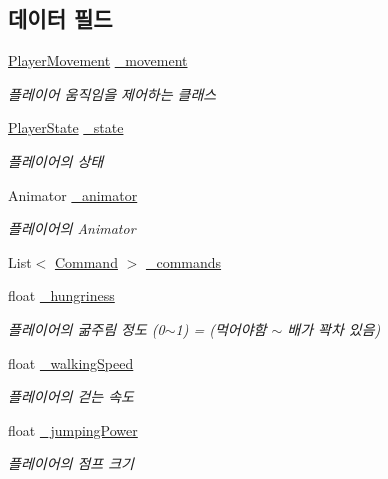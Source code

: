 \subsection*{데이터 필드}
\begin{DoxyCompactItemize}
\item 
\mbox{\hyperlink{class_player_movement}{Player\+Movement}} \mbox{\hyperlink{class_player_controller_ad788cfe2e37318d22d52010dc0fecd57}{\+\_\+movement}}
\begin{DoxyCompactList}\small\item\em 플레이어 움직임을 제어하는 클래스 \end{DoxyCompactList}\item 
\mbox{\hyperlink{class_player_state}{Player\+State}} \mbox{\hyperlink{class_player_controller_addcd33a9c23c1b949964365390c7a6eb}{\+\_\+state}}
\begin{DoxyCompactList}\small\item\em 플레이어의 상태 \end{DoxyCompactList}\item 
Animator \mbox{\hyperlink{class_player_controller_ada29d77d333483963257e51a6e15b8ae}{\+\_\+animator}}
\begin{DoxyCompactList}\small\item\em 플레이어의 Animator \end{DoxyCompactList}\item 
List$<$ \mbox{\hyperlink{class_command}{Command}} $>$ \mbox{\hyperlink{class_player_controller_aab899fbdea369867174253d2efd978fe}{\+\_\+commands}}
\item 
float \mbox{\hyperlink{class_player_controller_ab4fed78a016e8baca12e50bb3d7f034a}{\+\_\+hungriness}}
\begin{DoxyCompactList}\small\item\em 플레이어의 굶주림 정도 (0$\sim$1) = (먹어야함 $\sim$ 배가 꽉차 있음) \end{DoxyCompactList}\item 
float \mbox{\hyperlink{class_player_controller_a1ab6a7892eecf1a9fa7b1a49842a3dd2}{\+\_\+walking\+Speed}}
\begin{DoxyCompactList}\small\item\em 플레이어의 걷는 속도 \end{DoxyCompactList}\item 
float \mbox{\hyperlink{class_player_controller_ad5b01cf8e0c714d76cbd667d4fab7c25}{\+\_\+jumping\+Power}}
\begin{DoxyCompactList}\small\item\em 플레이어의 점프 크기 \end{DoxyCompactList}\end{DoxyCompactItemize}
